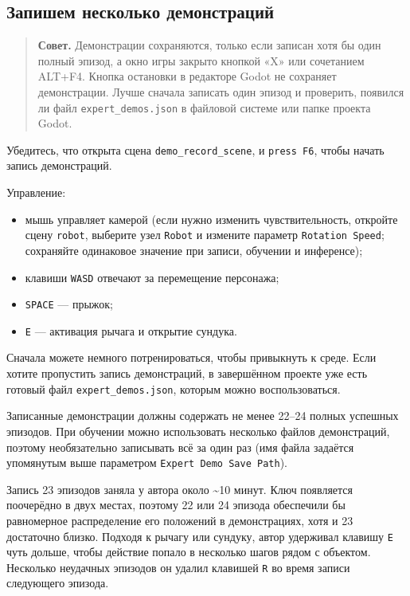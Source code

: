 \documentclass[11pt,a4paper]{article}
\begin{document}
\subsection{Запишем несколько демонстраций}\label{lets-record-some-demos}

\begin{quote}
\textbf{Совет.} Демонстрации сохраняются, только если записан хотя бы один полный эпизод, а окно игры закрыто кнопкой «X» или сочетанием ALT+F4. Кнопка остановки в редакторе Godot не сохраняет демонстрации. Лучше сначала записать один эпизод и проверить, появился ли файл \passthrough{\lstinline!expert_demos.json!} в файловой системе или папке проекта Godot.
\end{quote}

Убедитесь, что открыта сцена \passthrough{\lstinline!demo_record_scene!}, и \passthrough{\lstinline!press F6!}, чтобы начать запись демонстраций.

Управление:

\begin{itemize}
\tightlist
\item
  мышь управляет камерой (если нужно изменить чувствительность, откройте сцену \passthrough{\lstinline!robot!}, выберите узел \passthrough{\lstinline!Robot!} и измените параметр \passthrough{\lstinline!Rotation Speed!}; сохраняйте одинаковое значение при записи, обучении и инференсе);
\item
  клавиши \passthrough{\lstinline!WASD!} отвечают за перемещение персонажа;
\item
  \passthrough{\lstinline!SPACE!} --- прыжок;
\item
  \passthrough{\lstinline!E!} --- активация рычага и открытие сундука.
\end{itemize}

Сначала можете немного потренироваться, чтобы привыкнуть к среде. Если хотите пропустить запись демонстраций, в завершённом проекте уже есть готовый файл \passthrough{\lstinline!expert_demos.json!}, которым можно воспользоваться.

Записанные демонстрации должны содержать не менее 22--24 полных успешных эпизодов. При обучении можно использовать несколько файлов демонстраций, поэтому необязательно записывать всё за один раз (имя файла задаётся упомянутым выше параметром \passthrough{\lstinline!Expert Demo Save Path!}).

Запись 23 эпизодов заняла у автора около \textasciitilde10 минут. Ключ появляется поочерёдно в двух местах, поэтому 22 или 24 эпизода обеспечили бы равномерное распределение его положений в демонстрациях, хотя и 23 достаточно близко. Подходя к рычагу или сундуку, автор удерживал клавишу \passthrough{\lstinline!E!} чуть дольше, чтобы действие попало в несколько шагов рядом с объектом. Несколько неудачных эпизодов он удалил клавишей \passthrough{\lstinline!R!} во время записи следующего эпизода.
\end{document}
